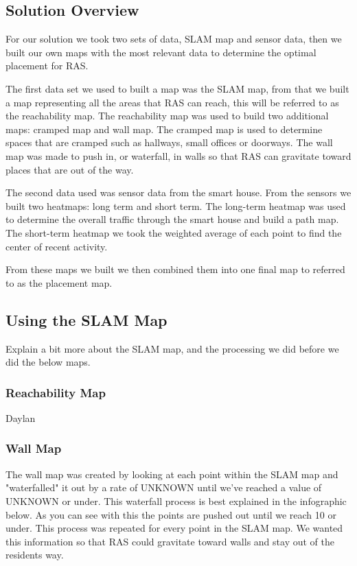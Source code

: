 \documentclass[11pt, conference, a4paper]{IEEEtran}
\begin{document}
\subsection{Solution Overview}
For our solution we took two sets of data, SLAM map and sensor data, then we built our own maps with the most relevant data to determine the optimal placement for RAS. 

The first data set we used to built a map was the SLAM map, from that we built a map representing all the areas that RAS can reach, this will be referred to as the reachability map. The reachability map was used to build two additional maps: cramped map and wall map. The cramped map is used to determine spaces that are cramped such as hallways, small offices or doorways. The wall map was made to push in, or waterfall, in walls so that RAS can gravitate toward places that are out of the way. 

The second data used was sensor data from the smart house. From the sensors we built two heatmaps: long term and short term. The long-term heatmap was used to determine the overall traffic through the smart house and build a path map. The short-term heatmap we took the weighted average of each point to find the center of recent activity.

From these maps we built we then combined them into one final map to referred to as the placement map. 


\subsection{Using the SLAM Map}
Explain a bit more about the SLAM map, and the processing we did before we did the below maps.

\subsubsection{Reachability Map}
Daylan


\subsubsection{Wall Map}
The wall map was created by looking at each point within the SLAM map and "waterfalled" it out by a rate of UNKNOWN until we've reached a value of UNKNOWN or under. This waterfall process is best explained in the infographic below. As you can see with this the points are pushed out until we reach 10 or under. This process was repeated for every point in the SLAM map. We wanted this information so that RAS could gravitate toward walls and stay out of the residents way. 
\end{document}
